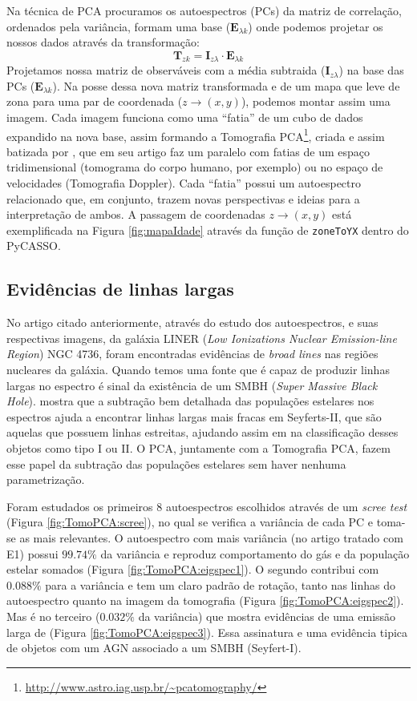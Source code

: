 Na técnica de PCA procuramos os autoespectros (PCs) da matriz de correlação,
ordenados pela variância, formam uma base ($\mathbf{E}{}_{\lambda k}$) onde 
podemos projetar os nossos dados através da transformação:
\begin{equation}
	\label{eq:TomoPCA:tomogram2D}
	\mathbf{T}{}_{z k} = \mathbf{I}{}_{z \lambda} \cdot \mathbf{E}{}_{\lambda k}
\end{equation}
Projetamos nossa matriz de observáveis com a média subtraida ($\mathbf{I}{}_{z
\lambda}$) na base das PCs ($\mathbf{E}{}_{\lambda k}$). Na posse dessa nova
matriz transformada e de um mapa que leve de zona para uma par de coordenada ($z
\to (x, y)$), podemos montar assim uma imagem. Cada imagem funciona como uma
``fatia'' de um cubo de dados expandido na nova base, assim formando a
Tomografia PCA\footnote{\url{http://www.astro.iag.usp.br/~pcatomography/}},
criada e assim batizada por \citet{Steiner2009}, que em seu artigo faz um
paralelo com fatias de um espaço tridimensional (tomograma do corpo humano, por
exemplo) ou no espaço de velocidades (Tomografia Doppler). Cada ``fatia'' possui
um autoespectro relacionado que, em conjunto, trazem novas perspectivas e ideias
para a interpretação de ambos. A passagem de coordenadas $z \to (x, y)$ está
exemplificada na Figura \ref{fig:mapaIdade} através da função de
\texttt{zoneToYX} dentro do PyCASSO.

\subsection{Evidências de linhas largas}

No artigo citado anteriormente, através do estudo dos autoespectros, e suas
respectivas imagens, da galáxia LINER ({\em Low Ionizations Nuclear
Emission-line Region}) NGC 4736, foram encontradas evidências de {\em broad
lines} nas regiões nucleares da galáxia. Quando temos uma fonte que é capaz de
produzir linhas largas no espectro é sinal da existência de um SMBH ({\em Super
Massive Black Hole}). \citet{CidFernandes2004} mostra que a subtração bem
detalhada das populações estelares nos espectros ajuda a encontrar linhas largas
mais fracas em Seyferts-II, que são aquelas que possuem linhas estreitas,
ajudando assim em na classificação desses objetos como tipo I ou II. O PCA,
juntamente com a Tomografia PCA, fazem esse papel da subtração das populações
estelares sem haver nenhuma parametrização.

Foram estudados os primeiros 8 autoespectros escolhidos através de um {\em scree
test} (Figura \ref{fig:TomoPCA:scree}), no qual se verifica a variância de cada PC e
toma-se as mais relevantes. O autoespectro com mais variância (no artigo tratado
com E1) possui $99.74\%$ da variância e reproduz comportamento do gás e da
população estelar somados (Figura \ref{fig:TomoPCA:eigspec1}). O segundo
contribui com $0.088\%$ para a variância e tem um claro padrão de rotação, tanto
nas linhas do autoespectro quanto na imagem da tomografia (Figura
\ref{fig:TomoPCA:eigspec2}). Mas é no terceiro ($0.032\%$ da variância) que
mostra evidências de uma emissão larga de \Halpha (Figura
\ref{fig:TomoPCA:eigspec3}). Essa assinatura e uma evidência tipica de objetos
com um AGN associado a um SMBH (Seyfert-I).

